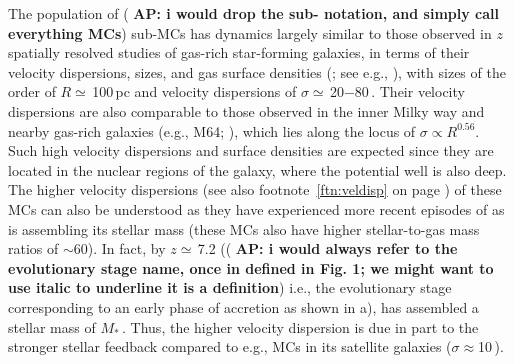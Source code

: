 \IfFileExists{emulateapjlegacy.cls}{\documentclass[iop]{emulateapjlegacy}}{\documentclass[iop]{emulateapj}}
\newcommand{\AP}[1]{({\bf \color{apcolor} AP: #1})}
\begin{document}
The population of \AP{i would drop the sub- notation, and simply call everything MCs} sub-MCs has dynamics largely similar to those observed in $z$ spatially resolved studies of gas-rich star-forming galaxies, in terms of their velocity dispersions, sizes, and gas surface densities (; see e.g., \citealt{Swinbank11a}), with sizes of the order of $R\simeq$\,100\,pc and velocity dispersions of $\sigma\simeq$\,20$-$80\,\kms.
%
%
Their velocity dispersions are also comparable to those observed in the inner Milky way and nearby gas-rich galaxies (e.g., M64; \citealt{Oka01a, Rosolowsky05a, Heyer09a}), which lies along the locus of $\sigma\propto R^{0.56}$. Such high velocity dispersions and surface densities are expected since they are located in the nuclear regions of the galaxy, where the potential well is also deep. The higher velocity dispersions (see also footnote~\ref{ftn:veldisp} on page \pageref{ftn:veldisp}) of these MCs can also be understood as they have experienced more recent episodes of \SF as \flower is assembling its stellar mass (these MCs also have higher stellar-to-gas mass ratios of $\sim$60).
%
In fact, by $z\simeq$\,7.2 (\AP{i would always refer to the evolutionary stage name, once in defined in Fig. 1; we might want to use italic to underline it is a definition} i.e., the evolutionary stage corresponding to an early phase of accretion as shown in a), \flower has assembled a stellar mass of $M_*$\,\Msun. Thus, the higher velocity dispersion is due in part to the stronger stellar feedback compared to e.g., MCs in its satellite galaxies ($\sigma\approx$10\,\kms).
\end{document}
